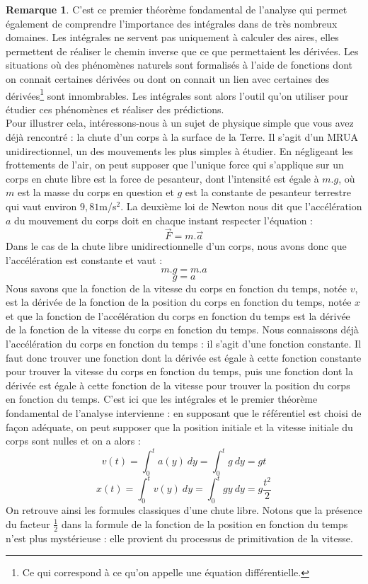 \documentclass[a4paper,fontsize=13pt]{scrreprt}
\theoremstyle{plain}
\theoremstyle{definition}
\newtheorem{rema}[subsection]{Remarque}
\begin{document}
\vfill
\begin{rema}
C'est ce premier théorème fondamental de l'analyse qui permet également de comprendre l'importance des intégrales dans de très nombreux domaines. Les intégrales ne servent pas uniquement à calculer des aires, elles permettent de réaliser le chemin inverse que ce que permettaient les dérivées. Les situations où des phénomènes naturels sont formalisés à l'aide de fonctions dont on connait certaines dérivées ou dont on connait un lien avec certaines des dérivées\footnote{Ce qui correspond à ce qu'on appelle une équation différentielle.} sont innombrables. Les intégrales sont alors l'outil qu'on utiliser pour étudier ces phénomènes et réaliser des prédictions. \\
Pour illustrer cela, intéressons-nous à un sujet de physique simple que vous avez déjà rencontré : la chute d'un corps à la surface de la Terre. Il s'agit d'un MRUA unidirectionnel, un des mouvements les plus simples à étudier. En négligeant les frottements de l'air, on peut supposer que l'unique force qui s'applique sur un corps en chute libre est la force de pesanteur, dont l'intensité est égale à $m.g$, où $m$ est la masse du corps en question et $g$ est la constante de pesanteur terrestre qui vaut environ $9,81$m/s$^2$. La deuxième loi de Newton nous dit que l'accélération $a$ du mouvement du corps doit en chaque instant respecter l'équation :
$$\vec{F} = m.\vec{a}$$
\newpage
Dans le cas de la chute libre unidirectionnelle d'un corps, nous avons donc que l'accélération est constante et vaut :
$$m.g=m.a$$
$$g=a$$
Nous savons que la fonction de la vitesse du corps en fonction du temps, notée $v$, est la dérivée de la fonction de la position du corps en fonction du temps, notée $x$ et que la fonction de l'accélération du corps en fonction du temps est la dérivée de la fonction de la vitesse du corps en fonction du temps. Nous connaissons déjà l'accélération du corps en fonction du temps : il s'agit d'une fonction constante. Il faut donc trouver une fonction dont la dérivée est égale à cette fonction constante pour trouver la vitesse du corps en fonction du temps, puis une fonction dont la dérivée est égale à cette fonction de la vitesse pour trouver la position du corps en fonction du temps. C'est ici que les intégrales et le premier théorème fondamental de l'analyse intervienne : en supposant que le référentiel est choisi de façon adéquate, on peut supposer que la position initiale et la vitesse initiale du corps sont nulles et on a alors :
$$v(t) = \int_0^t a(y)~dy = \int_0^t g~dy = gt$$
$$x(t) = \int_0^t v(y)~dy = \int_0^t gy~dy = g\frac{t^2}{2}$$
On retrouve ainsi les formules classiques d'une chute libre. Notons que la présence du facteur $\frac{1}{2}$ dans la formule de la fonction de la position en fonction du temps n'est plus mystérieuse : elle provient du processus de primitivation de la vitesse.
\end{rema}
\end{document}
